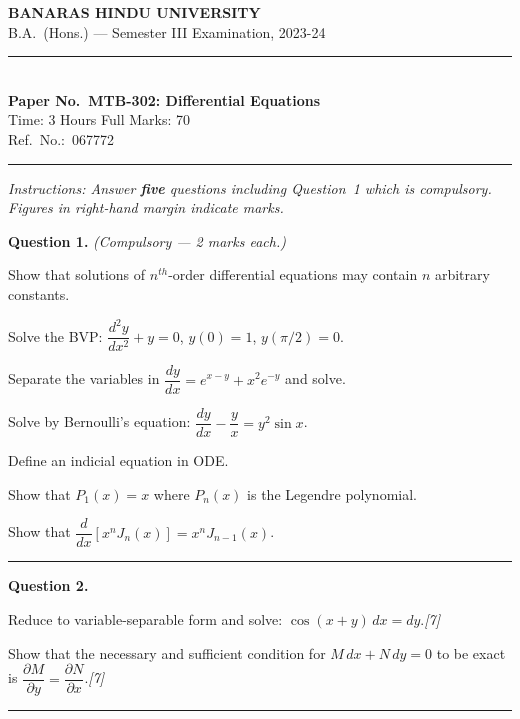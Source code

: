 \documentclass[11pt,a4paper]{article}
\newcommand{\pts}[1]{\hfill   \textit{[#1]}}
\begin{document}
\begin{center}
  {\large\bfseries BANARAS HINDU UNIVERSITY}\\[2pt]
  {\normalsize B.A.\ (Hons.) --- Semester III Examination, 2023-24}\\[6pt]
  \rule{0.8\linewidth}{0.5pt}\\[6pt]
  {\large\bfseries Paper No.\ MTB-302: Differential Equations}\\[4pt]
  {\normalsize Time: 3 Hours \hfill Full Marks: 70}\\[2pt]
  {\small Ref.\ No.:\ 067772}
\end{center}
\rule{\linewidth}{0.4pt}
\smallskip



\noindent   \textit{Instructions: Answer   \textbf{five} questions including Question~1 which is compulsory. Figures in right-hand margin indicate marks.}
\bigskip




\noindent   \textbf{Question 1.}   \textit{(Compulsory --- 2 marks each.)}

\begin{parts}
  \item Show that solutions of $n^{th}$-order differential equations may contain $n$ arbitrary constants.
  \item Solve the BVP: $\dfrac{d^2y}{dx^2}+y=0$, $y(0)=1$, $y(\pi/2)=0$.
  \item Separate the variables in $\dfrac{dy}{dx}=e^{x-y}+x^2 e^{-y}$ and solve.
  \item Solve by Bernoulli's equation: $\dfrac{dy}{dx}-\dfrac{y}{x}=y^2\sin x$.
  \item Define an indicial equation in ODE.
  \item Show that $P_1(x)=x$ where $P_n(x)$ is the Legendre polynomial.
  \item Show that $\dfrac{d}{dx}[x^n J_n(x)]=x^n J_{n-1}(x)$.
\end{parts}
\medskip\rule{\linewidth}{0.2pt}

\medskip


\noindent   \textbf{Question 2.}

\begin{parts}
  \item Reduce to variable-separable form and solve: $\cos(x+y)\,dx=dy$.\pts{7}
  \item Show that the necessary and sufficient condition for $M\,dx+N\,dy=0$ to be exact is $\dfrac{\partial M}{\partial y}=\dfrac{\partial N}{\partial x}$.\pts{7}
\end{parts}
\medskip\rule{\linewidth}{0.2pt}
\end{document}
